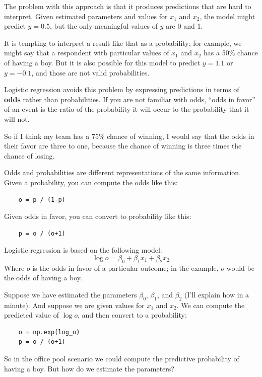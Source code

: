 \documentclass[12pt]{book}
\begin{document}
The problem with this approach is that it produces predictions that
are hard to interpret.  Given estimated parameters and values for
$x_1$ and $x_2$, the model might predict $y=0.5$, but the only
meaningful values of $y$ are 0 and 1.

It is tempting to interpret a result like that as a probability; for
example, we might say that a respondent with particular values of
$x_1$ and $x_2$ has a 50\% chance of having a boy.  But it is also
possible for this model to predict $y=1.1$ or $y=-0.1$, and those
are not valid probabilities.

Logistic regression avoids this problem by expressing predictions in
terms of {\bf odds} rather than probabilities.  If you are not
familiar with odds, ``odds in favor'' of an event is the ratio of the
probability it will occur to the probability that it will not.

So if I think my team has a 75\% chance of winning, I would
say that the odds in their favor are three to one, because
the chance of winning is three times the chance of losing.

Odds and probabilities are different representations of the same
information.  Given a probability, you can compute the odds like this:

\begin{verbatim}
    o = p / (1-p)
\end{verbatim}

Given odds in favor, you can convert to
probability like this:

\begin{verbatim}
    p = o / (o+1)
\end{verbatim}

Logistic regression is based on the following model:
%
\[ \log o = \beta_0 + \beta_1 x_1 + \beta_2 x_2 \]
%
Where $o$ is the odds in favor of a particular outcome; in the
example, $o$ would be the odds of having a boy.

Suppose we have estimated the parameters $\beta_0$, $\beta_1$, and
$\beta_2$ (I'll explain how in a minute).  And suppose we are given
values for $x_1$ and $x_2$.  We can compute the predicted value of
$\log o$, and then convert to a probability:

\begin{verbatim}
    o = np.exp(log_o)
    p = o / (o+1)
\end{verbatim}

So in the office pool scenario we could compute the predictive
probability of having a boy.  But how do we estimate the parameters?
\end{document}
